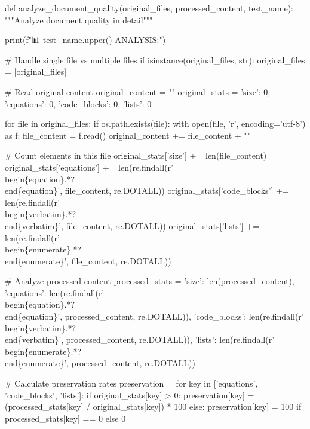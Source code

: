 def analyze_document_quality(original_files, processed_content, test_name):
    """Analyze document quality in detail"""
    
    print(f"\n📊 {test_name.upper()} ANALYSIS:")
    
    # Handle single file vs multiple files
    if isinstance(original_files, str):
        original_files = [original_files]
    
    # Read original content
    original_content = ""
    original_stats = {'size': 0, 'equations': 0, 'code_blocks': 0, 'lists': 0}
    
    for file in original_files:
        if os.path.exists(file):
            with open(file, 'r', encoding='utf-8') as f:
                file_content = f.read()
                original_content += file_content + "\n"
                
                # Count elements in this file
                original_stats['size'] += len(file_content)
                original_stats['equations'] += len(re.findall(r'\\begin\{equation\}.*?\\end\{equation\}', file_content, re.DOTALL))
                original_stats['code_blocks'] += len(re.findall(r'\\begin\{verbatim\}.*?\\end\{verbatim\}', file_content, re.DOTALL))
                original_stats['lists'] += len(re.findall(r'\\begin\{enumerate\}.*?\\end\{enumerate\}', file_content, re.DOTALL))
    
    # Analyze processed content
    processed_stats = {
        'size': len(processed_content),
        'equations': len(re.findall(r'\\begin\{equation\}.*?\\end\{equation\}', processed_content, re.DOTALL)),
        'code_blocks': len(re.findall(r'\\begin\{verbatim\}.*?\\end\{verbatim\}', processed_content, re.DOTALL)),
        'lists': len(re.findall(r'\\begin\{enumerate\}.*?\\end\{enumerate\}', processed_content, re.DOTALL))
    }
    
    # Calculate preservation rates
    preservation = {}
    for key in ['equations', 'code_blocks', 'lists']:
        if original_stats[key] > 0:
            preservation[key] = (processed_stats[key] / original_stats[key]) * 100
        else:
            preservation[key] = 100 if processed_stats[key] == 0 else 0
    
